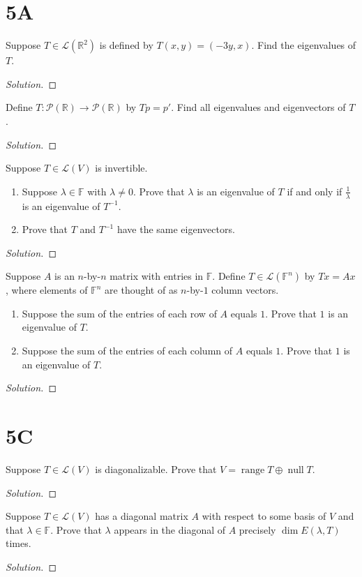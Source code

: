 \documentclass{article}
\newcommand{\F}{\mathbb F}
\newcommand{\LL}{\mathcal L}
\renewcommand{\P}{\mathcal P}
\newcommand{\R}{\mathbb R}
\DeclareMathOperator{\range}{range}
\DeclareMathOperator{\nul}{null}
\newenvironment{problem}[2][Problem]{\begin{trivlist}
\item[\hskip \labelsep {\bfseries #1}\hskip \labelsep {\bfseries #2.}]}{\end{trivlist}}
\newenvironment{solution}
  {\renewcommand{\qedsymbol}{}\begin{proof}[Solution]}
  {\end{proof}}
\begin{document}
\section*{5A}
\begin{problem}{7}
  Suppose $T\in\LL(\R^2)$ is defined by $T(x,y)=(-3y,x)$. Find the eigenvalues of $T$.
\end{problem}
\begin{solution}
\end{solution}
\newpage
\begin{problem}{11}
  Define $T:\P(\R)\to\P(\R)$ by $Tp=p'$. Find all eigenvalues and eigenvectors of $T$.
\end{problem}
\begin{solution}
\end{solution}
\newpage
\begin{problem}{21}
  Suppose $T\in\LL(V)$ is invertible.
  \begin{enumerate}[label=(\alph*)]
    \item Suppose $\lambda\in\F$ with $\lambda\neq 0$. Prove that $\lambda$ is an eigenvalue of $T$ if and only if $\frac{1}{\lambda}$ is an eigenvalue of $T^{-1}$.
    \item Prove that $T$ and $T^{-1}$ have the same eigenvectors.
  \end{enumerate}
\end{problem}
\begin{solution}
\end{solution}
\newpage
\begin{problem}{24}
  Suppose $A$ is an $n$-by-$n$ matrix with entries in $\F$. Define $T\in\LL(\F^n)$ by $Tx=Ax$, where elements of $\F^n$ are thought of as $n$-by-$1$ column vectors.
  \begin{enumerate}[label=(\alph*)]
    \item Suppose the sum of the entries of each row of $A$ equals $1$. Prove that $1$ is an eigenvalue of $T$.
    \item Suppose the sum of the entries of each column of $A$ equals $1$. Prove that $1$ is an eigenvalue of $T$.
  \end{enumerate}
\end{problem}
\begin{solution}
\end{solution}
\newpage
\section*{5C}
\begin{problem}{1}
  Suppose $T\in\LL(V)$ is diagonalizable. Prove that $V=\range T\oplus\nul T$.
\end{problem}
\begin{solution}
\end{solution}
\newpage
\begin{problem}{7}
  Suppose $T\in\LL(V)$ has a diagonal matrix $A$ with respect to some basis of $V$ and that $\lambda\in\F$. Prove that $\lambda$ appears in the diagonal of $A$ precisely $\dim E(\lambda,T)$ times.
\end{problem}
\begin{solution}

\end{solution}
\end{document}
